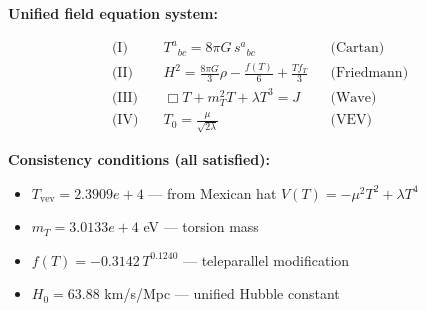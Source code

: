 
\textbf{Unified field equation system:}

\begin{align}
  \text{(I)} \quad & T^a{}_{bc} = 8\pi G \, s^a{}_{bc} && \text{(Cartan)} \\
  \text{(II)} \quad & H^2 = \frac{8\pi G}{3}\rho - \frac{f(T)}{6} + \frac{Tf_T}{3} && \text{(Friedmann)} \\
  \text{(III)} \quad & \Box T + m_T^2 T + \lambda T^3 = J && \text{(Wave)} \\
  \text{(IV)} \quad & T_0 = \frac{\mu}{\sqrt{2\lambda}} && \text{(VEV)}
\end{align}

\textbf{Consistency conditions (all satisfied):}
\begin{itemize}
  \item $T_{\text{vev}} = 2.3909e+4$ — from Mexican hat $V(T) = -\mu^2 T^2 + \lambda T^4$
  \item $m_T = 3.0133e+4$ eV — torsion mass
  \item $f(T) = -0.3142 \, T^{0.1240}$ — teleparallel modification
  \item $H_0 = 63.88$ km/s/Mpc — unified Hubble constant
\end{itemize}